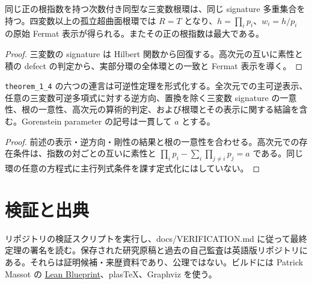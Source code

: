 \begin{theorem}
\label{thm:manuscript-rigidity}
\leanok
同じ正の根指数を持つ次数付き同型な三変数根環は、同じ signature 多重集合を持つ。四変数以上の孤立超曲面根環では $R=T$ となり、$h=\prod_i p_i$、$w_i=h/p_i$ の原始 Fermat 表示が得られる。またその正の根指数は最大である。
\end{theorem}
\begin{proof}
\leanok
{}
三変数の signature は Hilbert 関数から回復する。高次元の互いに素性と積の defect の判定から、実部分環の全体環との一致と Fermat 表示を導く。
\end{proof}

\begin{theorem}[可逆性定理]
\label{thm:one-four}
\leanok
\texttt{theorem\_1\_4} の六つの連言は可逆性定理を形式化する。全次元での主可逆表示、任意の三変数可逆多項式に対する逆方向、置換を除く三変数 signature の一意性、根の一意性、高次元の算術的判定、および根環とその表示に関する結論を含む。Gorenstein parameter の記号は一貫して $a$ とする。
\end{theorem}
\begin{proof}
\leanok
{}
前述の表示・逆方向・剛性の結果と根の一意性を合わせる。高次元での存在条件は、指数の対ごとの互いに素性と $\prod_i p_i-\sum_i\prod_{j\ne i}p_j=a$ である。同じ環の任意の方程式に主行列式条件を課す定式化にはしていない。
\end{proof}

\section*{検証と出典}
リポジトリの検証スクリプトを実行し、docs/VERIFICATION.md に従って最終定理の署名を読む。保存された研究原稿と過去の自己監査は英語版リポジトリにある。それらは証明候補・来歴資料であり、公理ではない。ビルドには Patrick Massot の \href{https://github.com/PatrickMassot/leanblueprint}{Lean Blueprint}、plasTeX、Graphviz を使う。


\clearpage


